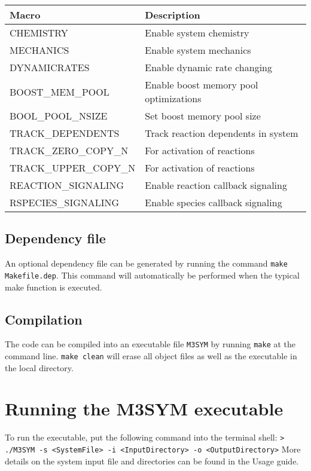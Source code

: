 \documentclass[11pt, oneside]{article}   	%
\begin{document}
\begin{table} [!ht]
\centering
\begin{tabular}{|l|l|}  
\hline
 \textbf{Macro} & \textbf{Description} \\
 \hline
  CHEMISTRY & Enable system chemistry \\
  \hline
  MECHANICS & Enable system mechanics \\ 
  \hline
  DYNAMICRATES & Enable dynamic rate changing \\
  \hline
  BOOST\_MEM\_POOL & Enable boost memory pool optimizations \\
  \hline
   BOOL\_POOL\_NSIZE & Set boost memory pool size \\
  \hline
   TRACK\_DEPENDENTS & Track reaction dependents in system \\
  \hline
    TRACK\_ZERO\_COPY\_N & For activation of reactions \\
  \hline
     TRACK\_UPPER\_COPY\_N & For activation of reactions \\
  \hline
     REACTION\_SIGNALING & Enable reaction callback signaling \\
  \hline
     RSPECIES\_SIGNALING & Enable species callback signaling\\
  \hline
\end{tabular}
\end{table}

	
\subsection {Dependency file}

An optional dependency file can be generated by running the command  \texttt{make Makefile.dep}. This command will automatically be performed when the typical make function is executed.

\subsection{Compilation}

The code can be compiled into an executable file \texttt{M3SYM} by running \texttt{make} at the command line. \texttt{make clean} will erase all object files as well as the executable in the local directory.

\section {Running the M3SYM executable}

To run the executable, put the following command into the terminal shell: \newline \newline\indent \texttt{> ./M3SYM -s <SystemFile> -i <InputDirectory> -o <OutputDirectory>} \newline \newline More details on the system input file and directories can be found in the Usage guide.
\end{document}
